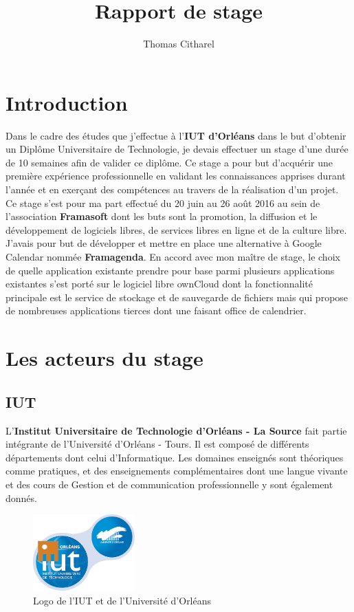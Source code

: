 \documentclass[10pt,a4paper]{report}
\author{Thomas Citharel}
\title{Rapport de stage}
\newcommand{\mychapter}[2]{
	\setcounter{chapter}{#1}
	\setcounter{section}{0}
	\chapter*{#2}
	\addcontentsline{toc}{chapter}{#2}
}
\begin{document}
	\maketitle
	\tableofcontents
	
	\mychapter{0}{Introduction}
	Dans le cadre des études que j'effectue à l'\textbf{IUT d'Orléans} dans le but d'obtenir un Diplôme Universitaire de Technologie, je devais effectuer un stage d'une durée de 10 semaines afin de valider ce diplôme. Ce stage a pour but d'acquérir une première expérience professionnelle en validant les connaissances apprises durant l'année et en exerçant des compétences au travers de la réalisation d'un projet.
	\\
	
	Ce stage s'est pour ma part effectué du 20 juin au 26 août 2016 au sein de l'association \textbf{Framasoft} dont les buts sont la promotion, la diffusion et le développement de logiciels libres, de services libres en ligne et de la culture libre.
	\\
	
	J'avais pour but de développer et mettre en place une alternative à Google Calendar nommée \textbf{Framagenda}. En accord avec mon maître de stage, le choix de quelle application existante prendre pour base parmi plusieurs applications existantes s'est porté sur le logiciel libre ownCloud dont la fonctionnalité principale est le service de stockage et de sauvegarde de fichiers mais qui propose de nombreuses applications tierces dont une faisant office de calendrier.
	
	\chapter{Les acteurs du stage}
	\section{IUT}
	L'\textbf{Institut Universitaire de Technologie d'Orléans - La Source} fait partie intégrante de l'Université d'Orléans - Tours. Il est composé de différents départements dont celui d'Informatique. Les domaines enseignés sont théoriques comme pratiques, et des enseignements complémentaires dont une langue vivante et des cours de Gestion et de communication professionnelle y sont également donnés.
	
	\begin{figure}[ht]
		\centering
		\includegraphics[width=0.35\textwidth]{images/logo-iut.png}
		\caption*{Logo de l'IUT et de l'Université d'Orléans}
		\label{normal_case}
	\end{figure}
	
\end{document}

